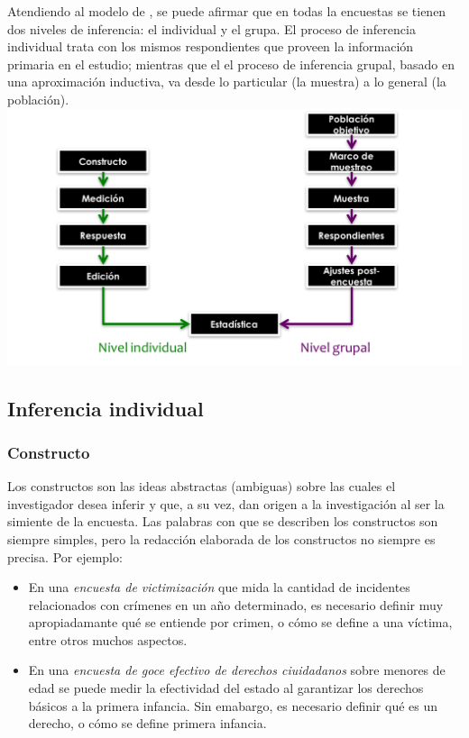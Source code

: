 \documentclass[
  10pt,
  spanish,
]{book}
\providecommand{\tightlist}{%
  \setlength{\itemsep}{0pt}\setlength{\parskip}{0pt}}
\begin{document}
Atendiendo al modelo de \citet{Groves_Fowler_Couper_Lepkowski_Singer_Tourangeau_2009}, se puede afirmar que en todas la encuestas se tienen dos niveles de inferencia: el individual y el grupa. El proceso de inferencia individual trata con los mismos respondientes que proveen la información primaria en el estudio; mientras que el el proceso de inferencia grupal, basado en una aproximación inductiva, va desde lo particular (la muestra) a lo general (la población).
\includegraphics{Pics/Picture6.png}

\hypertarget{inferencia-individual}{%
\subsection{Inferencia individual}\label{inferencia-individual}}

\hypertarget{constructo}{%
\subsubsection*{Constructo}\label{constructo}}

Los constructos son las ideas abstractas (ambiguas) sobre las cuales el investigador desea inferir y que, a su vez, dan origen a la investigación al ser la simiente de la encuesta. Las palabras con que se describen los constructos son siempre simples, pero la redacción elaborada de los constructos no siempre es precisa. Por ejemplo:

\begin{itemize}
\tightlist
\item
  En una \emph{encuesta de victimización} que mida la cantidad de incidentes relacionados con crímenes en un año determinado, es necesario definir muy apropiadamante qué se entiende por crimen, o cómo se define a una víctima, entre otros muchos aspectos.
\item
  En una \emph{encuesta de goce efectivo de derechos ciuidadanos} sobre menores de edad se puede medir la efectividad del estado al garantizar los derechos básicos a la primera infancia. Sin emabargo, es necesario definir qué es un derecho, o cómo se define primera infancia.
\end{itemize}
\end{document}
